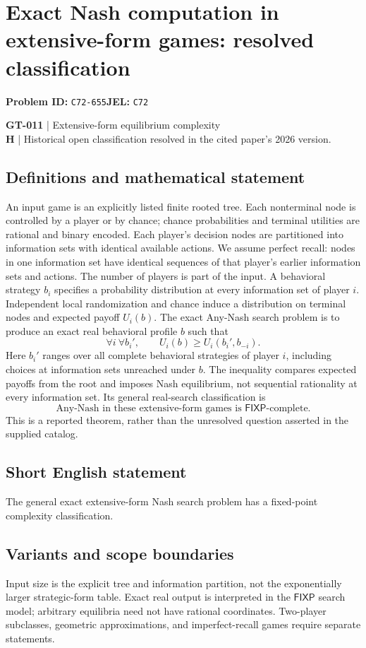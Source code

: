 \documentclass[11pt,a4paper]{article}
\begin{document}
\section*{Exact Nash computation in extensive-form games: resolved classification}
\textbf{Problem ID:} \texttt{C72-655}\quad \textbf{JEL:} \texttt{C72}\par
\label{problem:OP-0141}
\label{game:GT-011}
{\sffamily\small\color{muted}
\textbf{GT-011} | Extensive-form equilibrium complexity\\
\textbf{H} | Historical open classification resolved in the cited paper's 2026 version.
\par}
\subsection*{Definitions and mathematical statement}
An input game is an explicitly listed finite rooted tree. Each nonterminal node is controlled by a player or by chance; chance probabilities and terminal utilities are rational and binary encoded. Each player's decision nodes are partitioned into information sets with identical available actions. We assume perfect recall: nodes in one information set have identical sequences of that player's earlier information sets and actions. The number of players is part of the input.
A behavioral strategy $b_i$ specifies a probability distribution at every information set of player $i$. Independent local randomization and chance induce a distribution on terminal nodes and expected payoff $U_i(b)$. The exact Any-Nash search problem is to produce an exact real behavioral profile $b$ such that
\[
 \forall i\ \forall b_i',\qquad U_i(b)\geq U_i(b_i',b_{-i}).
\]
Here $b_i'$ ranges over all complete behavioral strategies of player $i$, including choices at information sets unreached under $b$. The inequality compares expected payoffs from the root and imposes Nash equilibrium, not sequential rationality at every information set.
Its general real-search classification is
\[
 \text{Any-Nash in these extensive-form games is }\mathsf{FIXP}\text{-complete}.
\]
This is a reported theorem, rather than the unresolved question asserted in the supplied catalog.
\subsection*{Short English statement}
The general exact extensive-form Nash search problem has a fixed-point complexity classification.
\subsection*{Variants and scope boundaries}
Input size is the explicit tree and information partition, not the exponentially larger strategic-form table. Exact real output is interpreted in the $\mathsf{FIXP}$ search model; arbitrary equilibria need not have rational coordinates. Two-player subclasses, geometric approximations, and imperfect-recall games require separate statements.
\end{document}
